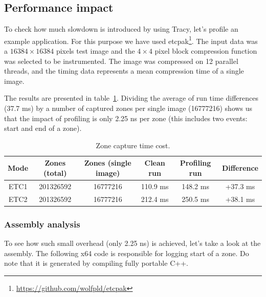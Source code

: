 \documentclass[hidelinks,titlepage,a4paper]{article}
\begin{document}
\subsection{Performance impact}
\label{perfimpact}

To check how much slowdown is introduced by using Tracy, let's profile an example application. For this purpose we have used etcpak\footnote{\url{https://github.com/wolfpld/etcpak}}. The input data was a $16384 \times 16384$ pixels test image and the $4 \times 4$ pixel block compression function was selected to be instrumented. The image was compressed on 12 parallel threads, and the timing data represents a mean compression time of a single image.

The results are presented in table~\ref{PerformanceImpact}. Dividing the average of run time differences (37.7 \si{\milli\second}) by a number of captured zones per single image (\num{16777216}) shows us that the impact of profiling is only 2.25 \si{\nano\second} per zone (this includes two events: start and end of a zone).

\begin{table}[h]
\centering
\begin{tabular}[h]{c|c|c|c|c|c}
\textbf{Mode} & \textbf{Zones (total)} & \textbf{Zones (single image)} & \textbf{Clean run} & \textbf{Profiling run} & \textbf{Difference} \\ \hline
ETC1 & \num{201326592} & \num{16777216} & 110.9 \si{\milli\second} & 148.2 \si{\milli\second} & +37.3 \si{\milli\second} \\
ETC2 & \num{201326592} & \num{16777216} & 212.4 \si{\milli\second} & 250.5 \si{\milli\second} & +38.1 \si{\milli\second}
\end{tabular}
\caption{Zone capture time cost.}
\label{PerformanceImpact}
\end{table}

\subsubsection{Assembly analysis}

To see how such small overhead (only 2.25 \si{\nano\second}) is achieved, let's take a look at the assembly. The following x64 code is responsible for logging start of a zone. Do note that it is generated by compiling fully portable C++.
\end{document}
